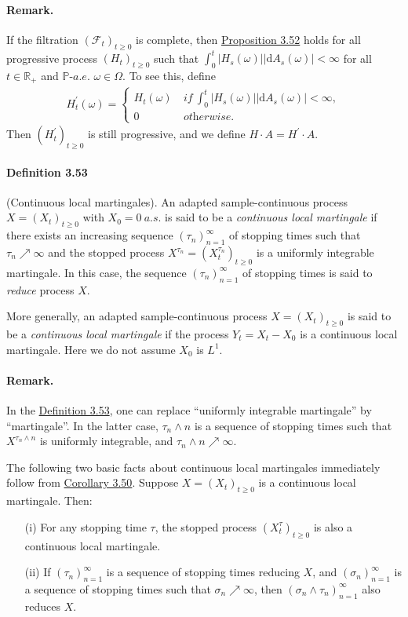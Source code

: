 \documentclass{article}
\numberwithin{equation}{section}
\renewcommand{\P}{\mathbb{P}}
\renewcommand{\d}{\mathrm{d}}
\theoremstyle{plain}
\theoremstyle{definition}
\begin{document}
\paragraph{Remark.} If the filtration $(\mathscr{F}_t)_{t\geq 0}$ is complete, then \hyperref[prop:3.52]{Proposition 3.52} holds for all progressive process $(H_t)_{t\geq 0}$ such that $\int_0^t\vert H_s(\omega)\vert\left\vert\d A_s(\omega)\right\vert < \infty$ for all $t\in\mathbb{R}_+$ and $\P$-$a.e.$ $\omega\in\Omega$. To see this, define
\begin{align*}
	H^\prime_t(\omega)=\begin{cases}
		H_t(\omega)\ &\textit{if}\ \int_0^t\vert H_s(\omega)\vert\left\vert\d A_s(\omega)\right\vert < \infty,\\
		0\ &\textit{otherwise}.
	\end{cases}
\end{align*}
Then $(H^\prime_t)_{t\geq 0}$ is still progressive, and we define $H\cdot A = H^\prime\cdot A$.

\paragraph{Definition 3.53\label{def:3.53}} (Continuous local martingales). An adapted sample-continuous process $X=(X_t)_{t\geq 0}$ with $X_0=0\ a.s.$ is said to be a \textit{continuous local martingale} if there exists an increasing sequence $(\tau_n)_{n=1}^\infty$ of stopping times such that $\tau_n\nearrow\infty$ and the stopped process $X^{\tau_n}=(X_t^{\tau_n})_{t\geq 0}$ is a uniformly integrable martingale. In this case, the sequence $(\tau_n)_{n=1}^\infty$ of stopping times is said to \textit{reduce} process $X$.

More generally, an adapted sample-continuous process $X=(X_t)_{t\geq 0}$ is said to be a \textit{continuous local martingale} if the process $Y_t=X_t-X_0$ is a continuous local martingale. Here we do not assume $X_0$ is $L^1$.

\paragraph{Remark.} In the \hyperref[def:3.53]{Definition 3.53}, one can replace ``uniformly integrable martingale'' by ``martingale''. In the latter case, $\tau_n\wedge n$ is a sequence of stopping times such that $X^{\tau_n\wedge n}$ is uniformly integrable, and $\tau_n\wedge n\nearrow\infty$.

The following two basic facts about continuous local martingales immediately follow from \hyperref[cor:3.50]{Corollary 3.50}. Suppose $X=(X_t)_{t\geq 0}$ is a continuous local martingale. Then:
\begin{itemize}
	\item[(i)] For any stopping time $\tau$, the stopped process $(X_t^\tau)_{t\geq 0}$ is also a continuous local martingale.
	\item[(ii)] If $(\tau_n)_{n=1}^\infty$ is a sequence of stopping times reducing $X$, and $(\sigma_n)_{n=1}^\infty$ is a sequence of stopping times such that $\sigma_n\nearrow\infty$, then $(\sigma_n\wedge\tau_n)_{n=1}^\infty$ also reduces $X$.
\end{itemize}
\end{document}
